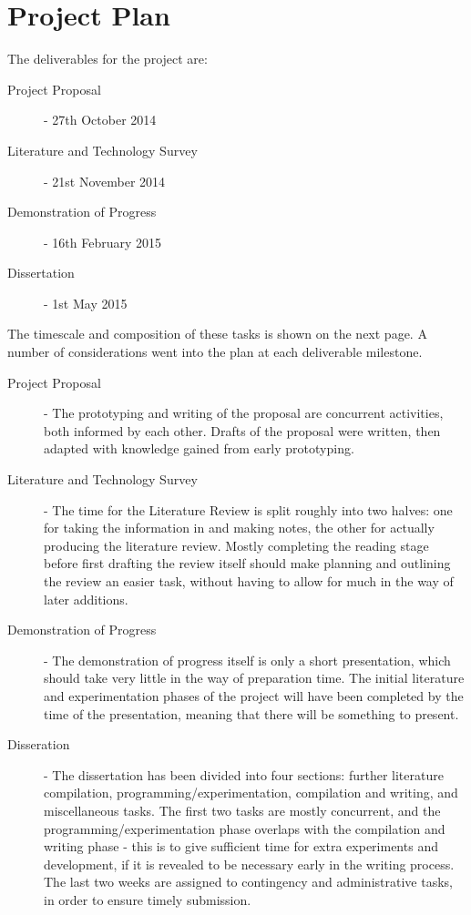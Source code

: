 \documentclass{article}
\begin{document}
\newpage
\section{Project Plan}
\label{sec:project-plan}
The deliverables for the project are:
\begin{description}
	\item[Project Proposal] - 27th October 2014
	\item[Literature and Technology Survey] - 21st November 2014
	\item[Demonstration of Progress] - 16th February 2015
	\item[Dissertation] - 1st May 2015
\end{description}

The timescale and composition of these tasks is shown on the next page. A number of considerations went into the plan at each deliverable milestone.
\begin{description}
	\item[Project Proposal] - The prototyping and writing of the proposal are concurrent activities, both informed by each other. Drafts of the proposal were written, then adapted with knowledge gained from early prototyping.
	\item[Literature and Technology Survey] - The time for the Literature Review is split roughly into two halves: one for taking the information in and making notes, the other for actually producing the literature review. Mostly completing the reading stage before first drafting the review itself should make planning and outlining the review an easier task, without having to allow for much in the way of later additions.
	\item[Demonstration of Progress] - The demonstration of progress itself is only a short presentation, which should take very little in the way of preparation time. The initial literature and experimentation phases of the project will have been completed by the time of the presentation, meaning that there will be something to present.
	\item[Disseration] - The dissertation has been divided into four sections: further literature compilation, programming/experimentation, compilation and writing, and miscellaneous tasks. The first two tasks are mostly concurrent, and the programming/experimentation phase overlaps with the compilation and writing phase - this is to give sufficient time for extra experiments and development, if it is revealed to be necessary early in the writing process. The last two weeks are assigned to contingency and administrative tasks, in order to ensure timely submission.
\end{description}
\end{document}
